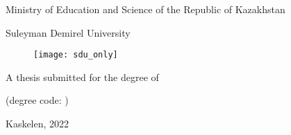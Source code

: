 \begin{titlepage}
\begin{center}
\large
Ministry of Education and Science of the Republic of Kazakhstan

Suleyman Demirel University

\vspace{1cm}
\begin{figure}[h]
    \centering
    \texttt{[image: sdu\_only]}
\end{figure}

\vspace{2cm}
\Large
\myauthor

\vspace{1cm}
\Large
\textbf{\mytitle}

\vspace{1cm}
\large
A thesis submitted for the degree of

\mydegree

(degree code: \mydegreecode)

\vfill
Kaskelen, 2022

\end{center}
\end{titlepage}